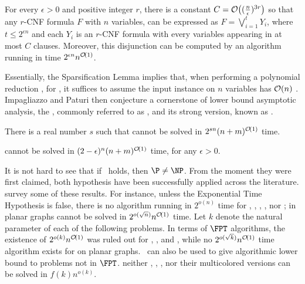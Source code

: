 \begin{class_definition*}
    For every $\epsilon > 0$ and positive
    integer $r$, there is a constant $C = \mathcal{O}\!\left((\frac{n}{\epsilon})^{3r}\right)$ so that any $r$-CNF formula $F$ with $n$ variables, can be expressed as $F = \bigvee_{i=1}^t Y_i$, where $t \leq 2^{\epsilon n}$ and each $Y_i$ is an $r$-CNF formula with every variables appearing in at most $C$ clauses.
    Moreover, this disjunction can be computed by an algorithm running in time $2^{\epsilon n}n^{\mathcal{O}\!\left(1\right)}$.
\end{class_definition*}

Essentially, the Sparsification Lemma implies that, when performing a polynomial reduction , for , it suffices to assume the input instance on $n$ variables has $\mathcal{O}\!\left(n\right)$ .
Impagliazzo and Paturi then conjecture a cornerstone of lower bound asymptotic analysis, the , commonly referred to as \ETH, and its strong version, known as \SETH.

\begin{class_definition*}
    There is a real number $s$ such that  cannot be solved in $2^{sn}(n + m)^{\mathcal{O}\!\left(1\right)}$ time.
\end{class_definition*}


\begin{class_definition*}
     cannot be solved in $(2 - \epsilon)^{n}(n + m)^{\mathcal{O}\!\left(1\right)}$ time, for any $\epsilon > 0$.
\end{class_definition*}


It is not hard to see that if \ETH\ holds, then $\P \neq \NP$.
From the moment they were first claimed, both hypothesis have been successfully applied across the literature.
\cite{eth_survey} survey some of these results.
For instance, unless the Exponential Time Hypothesis is false, there is no algorithm running in $2^{o(n)}$ time for , , , , nor ;
 in planar graphs cannot be solved in $2^{o(\sqrt{n})}n^{\mathcal{O}\!\left(1\right)}$ time.
Let $k$ denote the natural parameter of each of the following problems.
In terms of $\FPT$ algorithms, the existence of $2^{o(k)}n^{\mathcal{O}\!\left(1\right)}$ was ruled out for , , and , while no $2^{o(\sqrt{k})}n^{\mathcal{O}\!\left(1\right)}$ time algorithm exists for  on planar graphs.
\ETH\ can also be used to give algorithmic lower bound to problems not in $\FPT$.
\cite{eth_survey} neither , , , nor their multicolored versions can be solved in $f(k)n^{o(k)}$.


